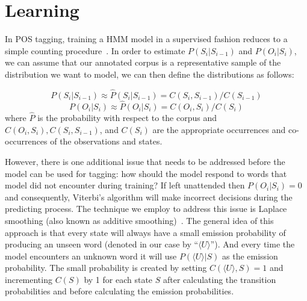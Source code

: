 \section{Learning}
\label{sec:learning}
In POS tagging, training a HMM model in a supervised fashion reduces to a simple counting procedure~\cite{nlpBook}. In order to estimate $P( S_i | S_{i-1} )$ and $P( O_i | S_i )$, we can assume that our annotated corpus is a representative sample of the distribution we want to model, we can then define the distributions as follows:

\vspace{-1em}
\begin{equation}
P( S_i | S_{i-1} ) \approx \hat{P}( S_i | S_{i-1} ) = C( S_i, S_{i-1} )/C( S_{i-1} )
\end{equation}
\vspace{-1em}
\begin{equation}
P( O_i | S_i ) \approx \hat{P}( O_i | S_i ) = C( O_i, S_i )/C( S_i )
\end{equation}
where $\hat{P}$ is the probability with respect to the corpus and $C( O_i, S_i ), C( S_i, S_{i-1} )$, and $C( S_i )$ are the appropriate occurrences and co-occurrences of the observations and states.

However, there is one additional issue that needs to be addressed before the model can be used for tagging: how should the model respond to words that model did not encounter during training? If left unattended then $P( O_i | S_i ) = 0$ and consequently, Viterbi's algorithm will make incorrect decisions during the predicting process. The technique we employ to address this issue is Laplace smoothing (also known as additive smoothing)~\cite{laplaceSmooth}. The general idea of this approach is that every state will always have a small emission probability of producing an unseen word (denoted in our case by ``$\langle U \rangle $''). And every time the model encounters an unknown word it will use $P(\langle U \rangle| S )$ as the emission probability. The small probability is created by setting $C(\langle U \rangle, S ) = 1$ and incrementing $C( S )$ by 1 for each state $S$ after calculating the transition probabilities and before calculating the emission probabilities.

